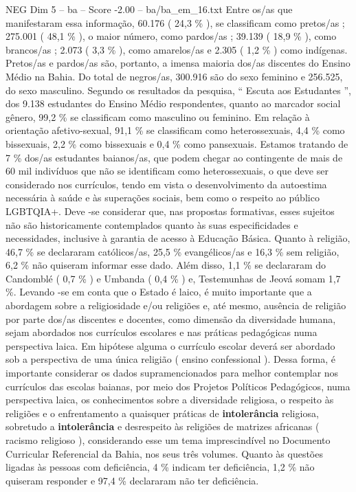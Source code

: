 \begin{textsample}{NEG Dim 5 – ba – Score -2.00 – ba/ba\_em\_16.txt}
Entre os/as que manifestaram essa informação, 60.176 ( 24,3 \% ), se classificam como pretos/as ; 275.001 ( 48,1 \% ), o maior número, como pardos/as ; 39.139 ( 18,9 \% ), como brancos/as ; 2.073 ( 3,3 \% ), como amarelos/as e 2.305 ( 1,2 \% ) como indígenas.
Pretos/as e pardos/as são, portanto, a imensa maioria dos/as discentes do Ensino Médio na Bahia.
Do total de negros/as, 300.916 são do sexo feminino e 256.525, do sexo masculino.
Segundo os resultados da pesquisa, “ Escuta aos Estudantes ”, dos 9.138 estudantes do Ensino Médio respondentes, quanto ao marcador social gênero, 99,2 \% se classificam como masculino ou feminino.
Em relação à orientação afetivo-sexual, 91,1 \% se classificam como heterossexuais, 4,4 \% como bissexuais, 2,2 \% como bissexuais e 0,4 \% como pansexuais.
Estamos tratando de 7 \% dos/as estudantes baianos/as, que podem chegar ao contingente de mais de 60 mil indivíduos que não se identificam como heterossexuais, o que deve ser considerado nos currículos, tendo em vista o desenvolvimento da autoestima necessária à saúde e às superações sociais, bem como o respeito ao público LGBTQIA+.
Deve -se considerar que, nas propostas formativas, esses sujeitos não são historicamente contemplados quanto às suas especificidades e necessidades, inclusive à garantia de acesso à Educação Básica.
Quanto à religião, 46,7 \% se declararam católicos/as, 25,5 \% evangélicos/as e 16,3 \% sem religião, 6,2 \% não quiseram informar esse dado.
Além disso, 1,1 \% se declararam do Candomblé ( 0,7 \% ) e Umbanda ( 0,4 \% ) e, Testemunhas de Jeová somam 1,7 \%.
Levando -se em conta que o Estado é laico, é muito importante que a abordagem sobre a religiosidade e/ou religiões e, até mesmo, ausência de religião por parte dos/as discentes e docentes, como dimensão da diversidade humana, sejam abordados nos currículos escolares e nas práticas pedagógicas numa perspectiva laica.
Em hipótese alguma o currículo escolar deverá ser abordado sob a perspectiva de uma única religião ( ensino confessional ).
Dessa forma, é importante considerar os dados supramencionados para melhor contemplar nos currículos das escolas baianas, por meio dos Projetos Políticos Pedagógicos, numa perspectiva laica, os conhecimentos sobre a diversidade religiosa, o respeito às religiões e o enfrentamento a quaisquer práticas de \textbf{intolerância} religiosa, sobretudo a \textbf{intolerância} e desrespeito às religiões de matrizes africanas ( racismo religioso ), considerando esse um tema imprescindível no Documento Curricular Referencial da Bahia, nos seus três volumes.
Quanto às questões ligadas às pessoas com deficiência, 4 \% indicam ter deficiência, 1,2 \% não quiseram responder e 97,4 \% declararam não ter deficiência.

\end{textsample}
